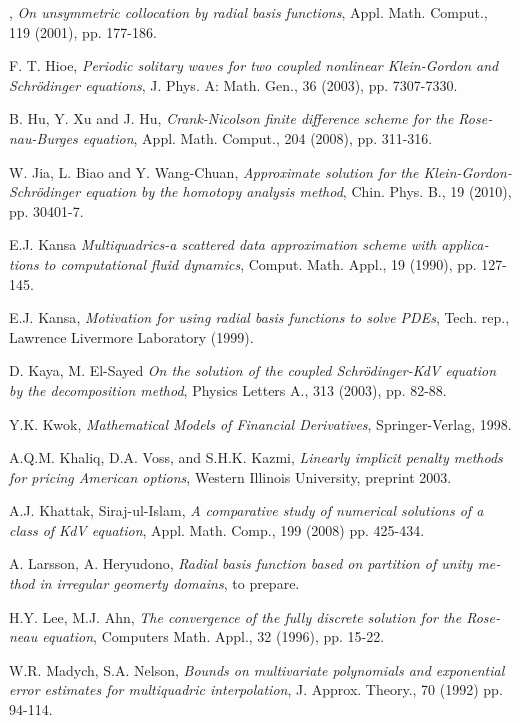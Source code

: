 \begin{thebibliography}{99}
\begin{latin}
, {\em On unsymmetric
collocation by radial basis functions}, Appl. Math. Comput., 119
(2001), pp. 177-186.

\bibitem{[18]} {\sc F. T. Hioe}, {\em Periodic solitary waves for two coupled nonlinear Klein-Gordon and Schr\"{o}dinger equations}, J. Phys. A: Math. Gen., 36
(2003), pp. 7307-7330.

\bibitem{[48]} {\sc B. Hu, Y. Xu and J. Hu}, {\em Crank-Nicolson finite difference scheme for the
Rosenau-Burges equation}, Appl. Math. Comput., 204 (2008), pp.
311-316.

\bibitem{[66]} {\sc W. Jia, L. Biao and Y. Wang-Chuan}, {\em Approximate solution for the Klein-Gordon-Schr\"{o}dinger
equation by the homotopy analysis method}, Chin. Phys. B., 19
(2010), pp. 30401-7.

\bibitem{[77]} {\sc E.J. Kansa} {\em Multiquadrics-a  scattered data approximation scheme with
applications to computational fluid dynamics}, Comput. Math.
Appl., 19 (1990), pp. 127-145.

\bibitem{[78]} {\sc E.J. Kansa}, {\em Motivation for using radial basis
functions to solve PDEs}, Tech. rep., Lawrence Livermore
Laboratory (1999).

\bibitem{[71]} {\sc D. Kaya, M. El-Sayed} {\em On the solution of the coupled Schr\"{o}dinger-KdV equation
by the decomposition method}, Physics Letters A., 313 (2003), pp.
82-88.

\bibitem{[52]} {\sc Y.K. Kwok}, {\em Mathematical Models of Financial Derivatives}, Springer-Verlag, 1998.

\bibitem{[57]} {\sc A.Q.M. Khaliq, D.A. Voss, and S.H.K. Kazmi}, {\em Linearly implicit penalty
methods for pricing American options}, Western Illinois
University, preprint 2003.

\bibitem{[42]} {\sc A.J. Khattak,
Siraj-ul-Islam}, {\em A comparative study of numerical solutions
of a class of KdV equation}, Appl. Math. Comp.,  199 (2008) pp.
425-434.

\bibitem{[90]} {\sc A. Larsson, A. Heryudono}, {\em Radial basis function based on partition of unity method in irregular geomerty domains}, to prepare.

\bibitem{[47]} {\sc H.Y. Lee, M.J. Ahn},
{\em The convergence of the fully discrete solution for the
Roseneau equation}, Computers Math. Appl., 32 (1996), pp. 15-22.

\bibitem{[8]} {\sc W.R. Madych, S.A. Nelson}, {\em Bounds on multivariate polynomials and exponential error
estimates for multiquadric interpolation}, J. Approx. Theory., 70
(1992) pp. 94-114.


\end{latin}
\end{thebibliography}
